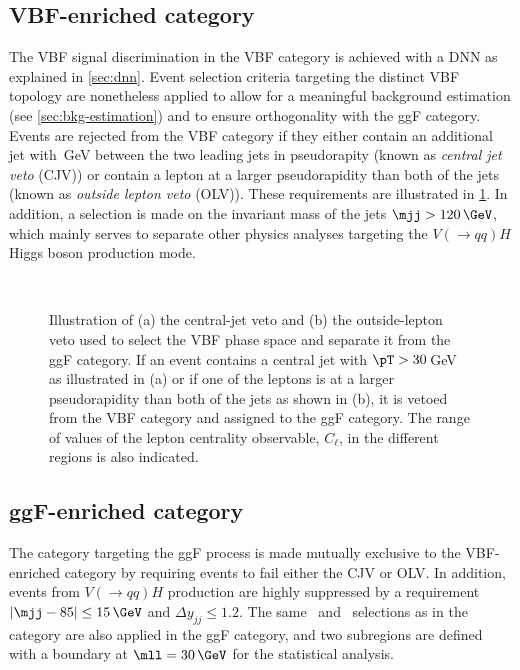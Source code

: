 \subsection{VBF-enriched \TwoJet category}
\label{subsec:vbf-category}
The VBF signal discrimination in the VBF \TwoJet category is achieved with a DNN as explained in \cref{sec:dnn}.
Event selection criteria targeting the distinct VBF topology are nonetheless applied to allow for a meaningful background estimation (see \cref{sec:bkg-estimation}) and to ensure orthogonality with the ggF \TwoJet category. 
Events are rejected from the VBF category if they either contain an additional jet with \,GeV between the two leading jets in pseudorapity (known as \emph{central jet veto} (CJV)) or contain a lepton at a larger pseudorapidity than both of the jets (known as \emph{outside lepton veto} (OLV)).
These requirements are illustrated in \cref{fig:cjv-olv-illustration}. 
In addition, a selection is made on the invariant mass of the jets $\mjj > 120\,\GeV$, which mainly serves to separate other physics analyses targeting the $V(\to qq)H$ Higgs boson production mode.
\begin{figure}[ht]
   \\
  \caption[Illustration of the central-jet veto and the outside-lepton veto.]{Illustration of (a) the central-jet veto and (b) the outside-lepton veto used to select the VBF phase space and separate it from the ggF \TwoJet category. If an event contains a central jet with $\pT > 30$\,GeV as illustrated in (a) or if one of the leptons is at a larger pseudorapidity than both of the jets as shown in (b), it is vetoed from the VBF \TwoJet category and assigned to the ggF \TwoJet category. The range of values of the lepton centrality observable, $C_\ell$, in the different regions is also indicated. 
  \label{fig:cjv-olv-illustration}
  }
\end{figure}

\subsection{ggF-enriched \TwoJet category}
\label{subsec:ggf-two-jet-category}
The \TwoJet category targeting the ggF process is made mutually exclusive to the VBF-enriched \TwoJet category by requiring events to fail either the CJV or OLV. 
In addition, events from $V(\to qq) H$ production are highly suppressed by a requirement $|\mjj  - 85| \le 15\,\GeV$ and $\Delta y_{jj} \le 1.2$. 
The same \mll\ and \DPhill\ selections as in the \ZeroJet category are also applied in the ggF \TwoJet category, and two subregions are defined with a boundary at $\mll = 30\,\GeV$ for the statistical analysis. 

